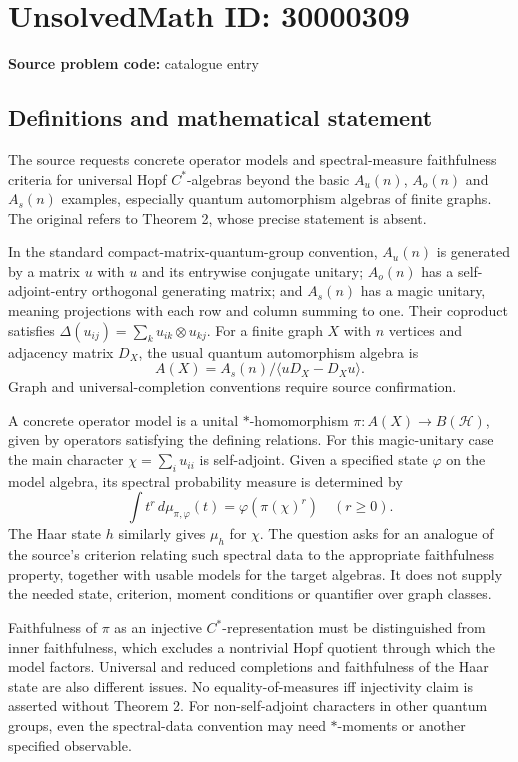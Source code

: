 \documentclass[11pt]{article}
\begin{document}
\section*{UnsolvedMath ID: 30000309}
\textbf{Source problem code:} catalogue entry
\subsection{Definitions and mathematical statement}
The source requests concrete operator models and spectral-measure faithfulness criteria for universal Hopf $C^*$-algebras beyond the basic $A_u(n)$, $A_o(n)$ and $A_s(n)$ examples, especially quantum automorphism algebras of finite graphs. The original refers to Theorem 2, whose precise statement is absent.

In the standard compact-matrix-quantum-group convention, $A_u(n)$ is generated by a matrix $u$ with $u$ and its entrywise conjugate unitary; $A_o(n)$ has a self-adjoint-entry orthogonal generating matrix; and $A_s(n)$ has a magic unitary, meaning projections with each row and column summing to one. Their coproduct satisfies $\Delta(u_{ij})=\sum_k u_{ik}\otimes u_{kj}$. For a finite graph $X$ with $n$ vertices and adjacency matrix $D_X$, the usual quantum automorphism algebra is
\[
 A(X)=A_s(n)/\langle uD_X-D_Xu\rangle.
\]
Graph and universal-completion conventions require source confirmation.

A concrete operator model is a unital $*$-homomorphism $\pi:A(X)\to B(\mathcal H)$, given by operators satisfying the defining relations. For this magic-unitary case the main character $\chi=\sum_i u_{ii}$ is self-adjoint. Given a specified state $\varphi$ on the model algebra, its spectral probability measure is determined by
\[
 \int t^r\,d\mu_{\pi,\varphi}(t)=\varphi(\pi(\chi)^r)
 \quad(r\geq0).
\]
The Haar state $h$ similarly gives $\mu_h$ for $\chi$. The question asks for an analogue of the source's criterion relating such spectral data to the appropriate faithfulness property, together with usable models for the target algebras. It does not supply the needed state, criterion, moment conditions or quantifier over graph classes.

Faithfulness of $\pi$ as an injective $C^*$-representation must be distinguished from inner faithfulness, which excludes a nontrivial Hopf quotient through which the model factors. Universal and reduced completions and faithfulness of the Haar state are also different issues. No equality-of-measures iff injectivity claim is asserted without Theorem 2. For non-self-adjoint characters in other quantum groups, even the spectral-data convention may need $*$-moments or another specified observable.
\end{document}
